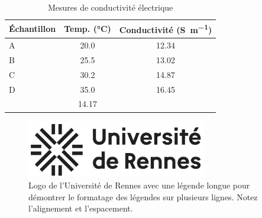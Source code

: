 \documentclass[12pt,a4paper]{report}
\begin{document}
\dominitoc %



\tableofcontents

\listoffigures
\listoftables

\pagestyle{fancy}



\begin{table}[H]
  \centering
  \caption{Mesures de conductivité électrique}
  \label{tab:conductivite}
  \begin{tabular}{l S[table-format=2.1] S[table-format=3.2]}
    \toprule
    {Échantillon} & {Temp. (\si{\celsius})} & {Conductivité (\si{\siemens\per\meter})} \\
    \midrule
    A & 20.0 & 12.34 \\
    B & 25.5 & 13.02 \\
    C & 30.2 & 14.87 \\
    D & 35.0 & 16.45 \\
    \addlinespace
     & 14.17 \\
    \bottomrule
  \end{tabular}
\end{table}

\begin{figure}[htbp] 
    \centering
    \includegraphics[width=0.7\textwidth]{figures/logos/Logo_Univ_Rennes.png}
    \caption{Logo de l'Université de Rennes avec une légende longue pour démontrer le formatage des légendes sur plusieurs lignes. Notez l'alignement et l'espacement.}
    \label{fig:logo_rennes}
\end{figure}
\end{document}
